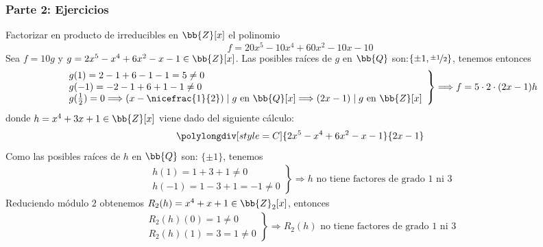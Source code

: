 \documentclass[12pt]{article}
\begin{document}
    \subsubsection*{Parte 2: Ejercicios}
    \setcounter{ejercicio}{0} %

    \begin{ejercicio}[1,25 puntos]
        Factorizar en producto de irreducibles en $\bb{Z}[x]$ el polinomio
        \begin{equation*}
            f=20x^5-10x^4+60x^2-10x-10
        \end{equation*}
        Sea $f=10g$ y $g=2x^5-x^4+6x^2-x-1\in \bb{Z}[x]$. Las posibles raíces de $g$ en $\bb{Q}$ son:$\{\pm1,\nicefrac{\pm1}{2}\}$, tenemos entonces
        \begin{align*}
            \left.\begin{array}{l}
            g(1)=2-1+6-1-1=5\neq0\\
            g(-1)=-2-1+6+1-1\neq0 \\
            g(\frac{1}{2})=0\Longrightarrow(x-\nicefrac{1}{2})\mid g \text{ en } \bb{Q}[x] \Longrightarrow (2x-1)\mid g \text{ en } \bb{Z}[x]
            \end{array}\right\} \Longrightarrow f=5\cdot2\cdot(2x-1)h 
        \end{align*}
        donde $h=x^4+3x+1\in\bb{Z}[x]$ viene dado del siguiente cálculo:\\
        \[
        \polylongdiv[style=C]{2x^5-x^4+6x^2-x-1}{2x - 1}
        \]
        Como las posibles raíces de $h$ en $\bb{Q}$ son: $\{\pm1\}$, tenemos 
        \begin{align*}
            \left.\begin{array}{l}
                h(1)=1+3+1\neq0 \\
                h(-1)=1-3+1=-1\neq0
            \end{array} \right\} \Longrightarrow h\text{ no tiene factores de grado }1 \text{ ni }3
        \end{align*}
        Reduciendo módulo $2$ obtenemos $R_2(h)=x^4+x+1\in\bb{Z}_2[x]$, entonces
        \begin{align*}
            \left.\begin{array}{l}
                R_2(h)(0)=1\neq0 \\
                R_2(h)(1)=3=1\neq0
            \end{array} \right\} \Longrightarrow R_2(h) \text{ no tiene factores de grado }1 \text{ ni }3
        \end{align*}

\end{ejercicio}
\end{document}
